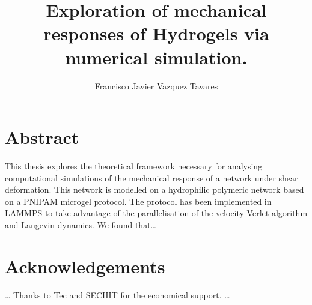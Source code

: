 \documentclass[12pt,colorful,boxey]{tufte-style-thesis}
\author{Francisco Javier Vazquez Tavares}
\title{Exploration of mechanical responses of Hydrogels via numerical simulation.}
\begin{document}
\maketitle

\justifying

\chapter*{Abstract}
This thesis explores the theoretical framework necessary for analysing computational simulations of the mechanical response of a network under shear deformation.
This network is modelled on a hydrophilic polymeric network based on a PNIPAM microgel protocol.
The protocol has been implemented in LAMMPS to take advantage of the parallelisation of the velocity Verlet algorithm and Langevin dynamics.
We found that\ldots


\chapter*{Acknowledgements}
\ldots 
Thanks to Tec and SECHIT for the economical support.
\ldots

\tableofcontents
\listoffigures
\listoftables


\mainmatter



\end{document}
